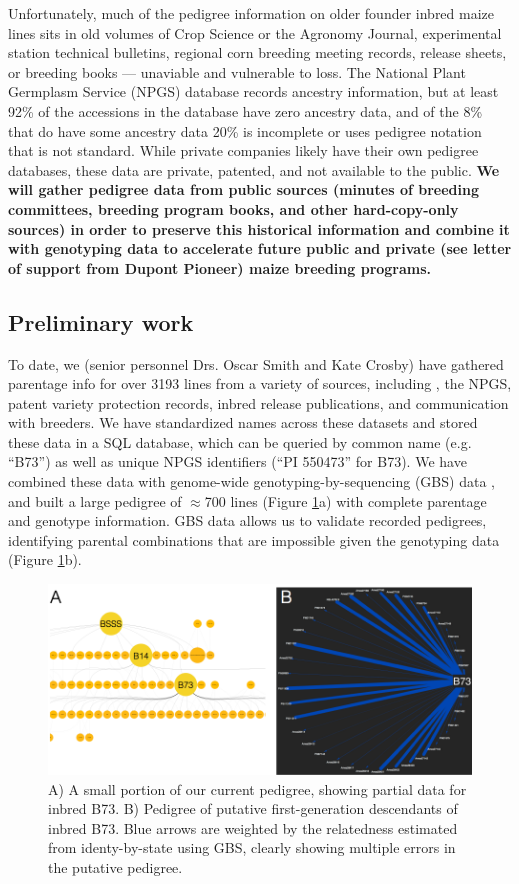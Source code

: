 \documentclass[12pt]{article}
\begin{document}
Unfortunately, much of the pedigree information on older founder inbred maize lines sits in old volumes of Crop Science or the Agronomy Journal, experimental station technical bulletins, regional corn breeding meeting records, release sheets, or breeding books --- unaviable and vulnerable to loss.  
The National Plant Germplasm Service (NPGS) database records ancestry information, but at least 92\% of the accessions in the database have zero ancestry data, and of the 8\% that do have some ancestry data 20\% is incomplete or uses pedigree notation that is not standard. 
While private companies likely have their own pedigree databases, these data are private, patented, and not available to the public. 
\textbf{We will gather pedigree data from public sources (minutes of breeding committees, breeding program books, and other hard-copy-only sources) in order to preserve this historical information and combine it with genotyping data to accelerate future public and private (see letter of support from Dupont Pioneer) maize breeding programs.}

\subsection*{Preliminary work}
To date, we (senior personnel Drs. Oscar Smith and Kate Crosby) have gathered parentage info for over 3193 lines from a variety of sources, including \cite{gerdes1993compilation}, the NPGS, patent variety protection records, inbred release publications, and communication with breeders.
We have standardized names across these datasets and stored these data in a SQL database, which can be queried by common name (e.g. ``B73'') as well as unique NPGS identifiers (``PI 550473'' for B73).
We have combined these data with genome-wide genotyping-by-sequencing (GBS) data \citep{romay2013comprehensive}, and built a large pedigree of $\approx$700 lines (Figure \ref{fig:combo}a) with complete parentage and genotype information. GBS data allows us to validate recorded pedigrees, identifying parental combinations that are impossible given the genotyping data (Figure \ref{fig:combo}b).

\begin{figure}
\includegraphics[width=1\linewidth]{crosby_combo}
\caption{A) A small portion of our current pedigree, showing partial data for inbred  B73. B) Pedigree of putative first-generation descendants of inbred B73. Blue arrows are weighted by the relatedness estimated from identy-by-state using GBS, clearly showing multiple errors in the putative pedigree.}
\label{fig:combo}
\end{figure}
\end{document}
